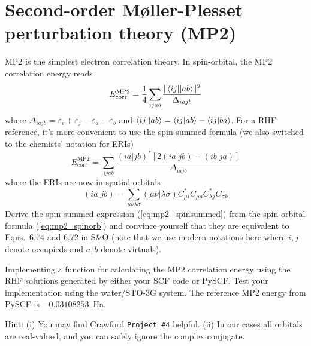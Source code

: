 \documentclass[parskip=full]{article}
\begin{document}
    \section{Second-order Møller-Plesset perturbation theory (MP2)}

    MP2 is the simplest electron correlation theory.
    In spin-orbital, the MP2 correlation energy reads
    \begin{equation}    \label{eq:mp2_spinorb}
        E_{\textrm{corr}}^{\textrm{MP2}}
            = \frac{1}{4} \sum_{ijab} \frac{|\braket{ij||ab}|^2}{\Delta_{iajb}}
    \end{equation}
    where $\Delta_{iajb} = \varepsilon_i + \varepsilon_j - \varepsilon_a - \varepsilon_b$ and $\braket{ij||ab} = \braket{ij|ab} - \braket{ij|ba}$.
    For a RHF reference, it's more convenient to use the spin-summed formula (we also switched to the chemists' notation for ERIs)
    \begin{equation}    \label{eq:mp2_spinsummed}
        E_{\textrm{corr}}^{\textrm{MP2}}
            = \sum_{ijab} \frac{(ia|jb)^* [2(ia|jb) - (ib|ja)]}{\Delta_{iajb}}
    \end{equation}
    where the ERIs are now in spatial orbitals
    \begin{equation}
        (ia|jb)
            = \sum_{\mu\nu\lambda\sigma} (\mu\nu|\lambda\sigma) C^*_{\mu i} C_{\mu a} C^*_{\lambda j} C_{\sigma k}
    \end{equation}
    Derive the spin-summed expression (\ref{eq:mp2_spinsummed}) from the spin-orbital formula (\ref{eq:mp2_spinorb}) and convince yourself that they are equivalent to Eqns.~6.74 and 6.72 in S\&O (note that we use modern notations here where $i,j$ denote occupieds and $a,b$ denote virtuals).

    Implementing a function for calculating the MP2 correlation energy using the RHF solutions generated by either your SCF code or PySCF.
    Test your implementation using the water/STO-3G system.
    The reference MP2 energy from PySCF is $-0.03108253$~Ha.

    Hint: (i) You may find Crawford \texttt{Project \#4} helpful.
    (ii) In our cases all orbitals are real-valued, and you can safely ignore the complex conjugate.





\end{document}
